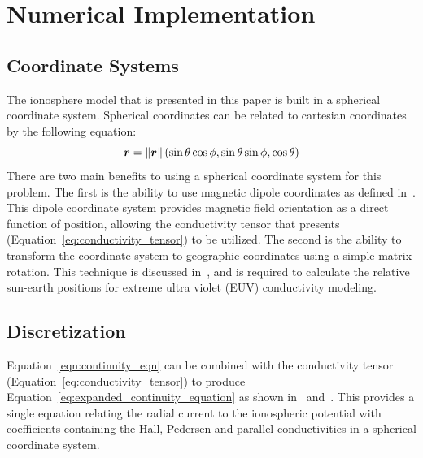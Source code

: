 \chapter{Numerical Implementation}
\label{chap:implementation}
\section{Coordinate Systems}
The ionosphere model that is presented in this paper is built in a spherical coordinate system. Spherical coordinates can be related to cartesian coordinates by the following equation:
\begin{equation}
	\bm r = \norm{\bm r}\left( \sin\theta\cos\phi, \sin\theta\sin\phi, \cos\theta\right)
	\label{eq:spherical_to_cartesian}
\end{equation}
There are two main benefits to using a spherical coordinate system for this problem. The first is the ability to use magnetic dipole coordinates as defined in~\citet{laundal2017}. This dipole coordinate system provides magnetic field orientation as a direct function of position, allowing the conductivity tensor that \citet{amm1996} presents (Equation~\ref{eq:conductivity_tensor}) to be utilized. The second is the ability to transform the coordinate system to geographic coordinates using a simple matrix rotation. This technique is discussed in~\citet{laundal2017}, and is required to calculate the relative sun-earth positions for extreme ultra violet (EUV) conductivity modeling.


\section{Discretization}
\label{sec:discretization}
Equation~\ref{eqn:continuity_eqn} can be combined with the conductivity tensor (Equation~\ref{eq:conductivity_tensor}) to produce Equation~\ref{eq:expanded_continuity_equation} as shown in~\citet{goodman1995} and~\citet{amm1996}. This provides a single equation relating the radial current to the ionospheric potential with coefficients containing the Hall, Pedersen and parallel conductivities in a spherical coordinate system.

